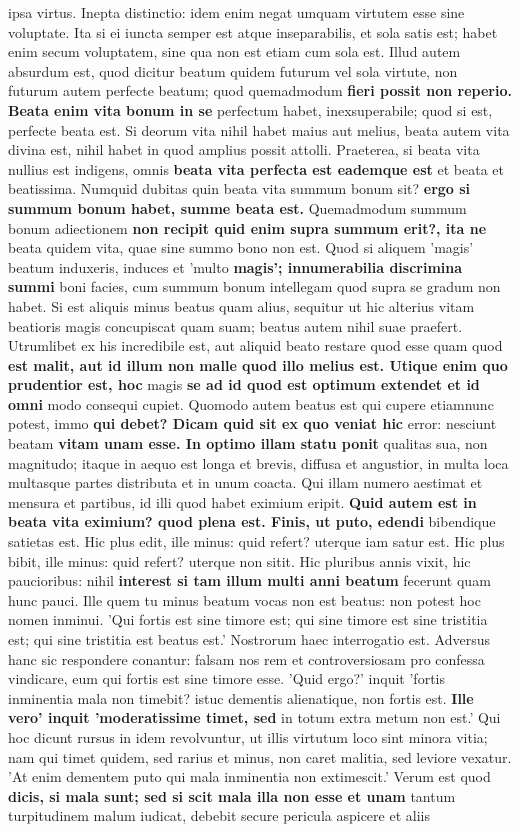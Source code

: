 ipsa virtus. Inepta distinctio: idem enim negat umquam virtutem esse sine voluptate. Ita si ei iuncta semper est atque inseparabilis, et sola satis est; habet enim secum voluptatem, sine qua non est etiam cum sola est. Illud autem absurdum est, quod dicitur beatum quidem futurum vel sola virtute, non futurum autem perfecte beatum; quod quemadmodum \textbf{fieri possit \textbf{non reperio. Beata} enim vita bonum in se} perfectum habet, inexsuperabile; quod si est, perfecte beata est. Si deorum vita nihil habet maius aut melius, beata autem vita divina est, nihil habet in quod amplius possit attolli. Praeterea, si beata vita nullius est indigens, omnis \textbf{\textbf{beata vita perfecta est eademque} est} et beata et beatissima. Numquid dubitas quin beata vita summum bonum sit? \textbf{ergo si summum bonum habet, summe beata est.} Quemadmodum summum bonum adiectionem \textbf{non recipit quid enim supra summum erit?, ita ne} beata quidem vita, quae sine summo bono non est. Quod si aliquem 'magis' beatum induxeris, induces et 'multo \textbf{magis'; innumerabilia discrimina summi} boni facies, cum summum bonum intellegam quod supra se gradum non habet. Si est aliquis minus beatus quam alius, sequitur ut hic alterius vitam beatioris magis concupiscat quam suam; beatus autem nihil suae praefert. Utrumlibet ex his incredibile est, aut aliquid beato restare quod esse quam quod \textbf{est malit, aut \textbf{id illum non malle quod illo} \textbf{melius est.} Utique enim quo prudentior est, hoc} magis \textbf{se \textbf{ad id quod est optimum extendet et id omni}} modo consequi cupiet. Quomodo autem beatus est qui cupere etiamnunc potest, immo \textbf{qui debet? Dicam quid sit ex quo veniat hic} error: nesciunt beatam \textbf{vitam unam esse. In optimo illam statu ponit} qualitas sua, non magnitudo; itaque in aequo est longa et brevis, diffusa et angustior, in multa loca multasque partes distributa et in unum coacta. Qui illam numero aestimat et mensura et partibus, id illi quod habet eximium eripit. \textbf{Quid autem est in beata vita \textbf{eximium? quod} plena est. Finis, ut puto, edendi} bibendique satietas est. Hic plus edit, ille minus: quid refert? uterque iam satur est. Hic plus bibit, ille minus: quid refert? uterque non sitit. Hic pluribus annis vixit, hic paucioribus: nihil \textbf{interest si tam illum multi anni beatum} fecerunt quam hunc pauci. Ille quem tu minus beatum vocas non est beatus: non potest hoc nomen inminui. 'Qui fortis est sine timore est; qui sine timore est sine tristitia est; qui sine tristitia est beatus est.' Nostrorum haec interrogatio est. Adversus hanc sic respondere conantur: falsam nos rem et controversiosam pro confessa vindicare, eum qui fortis est sine timore esse. 'Quid ergo?' inquit 'fortis inminentia mala non timebit? istuc dementis alienatique, non fortis est. \textbf{Ille vero' inquit 'moderatissime timet, sed} in totum extra metum non est.' Qui hoc dicunt rursus in idem revolvuntur, ut illis virtutum loco sint minora vitia; nam qui timet quidem, sed rarius et minus, non caret malitia, sed leviore vexatur. 'At enim dementem puto qui mala inminentia non extimescit.' Verum est quod \textbf{dicis, si mala \textbf{sunt; sed si scit mala illa} non esse et unam} tantum turpitudinem malum iudicat, debebit secure pericula aspicere et aliis 